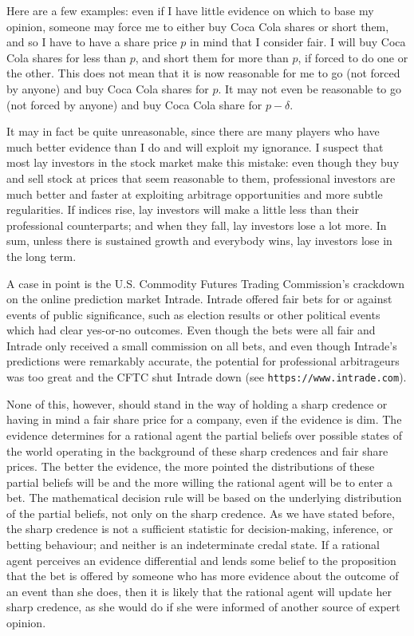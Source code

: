 \documentclass[11pt]{article}
\begin{document}
Here are a few examples: even if I have little evidence on which to
base my opinion, someone may force me to either buy Coca Cola shares
or short them, and so I have to have a share price $p$ in mind that I
consider fair. I will buy Coca Cola shares for less than $p$, and
short them for more than $p$, if forced to do one or the other. This
does not mean that it is now reasonable for me to go (not forced by
anyone) and buy Coca Cola shares for $p$. It may not even be
reasonable to go (not forced by anyone) and buy Coca Cola share for
$p-\delta$.

It may in fact be quite unreasonable, since there are many players who
have much better evidence than I do and will exploit my ignorance. I
suspect that most lay investors in the stock market make this mistake:
even though they buy and sell stock at prices that seem reasonable to
them, professional investors are much better and faster at exploiting
arbitrage opportunities and more subtle regularities. If indices rise,
lay investors will make a little less than their professional
counterparts; and when they fall, lay investors lose a lot more. In
sum, unless there is sustained growth and everybody wins, lay
investors lose in the long term.

A case in point is the U.S. Commodity Futures Trading Commission's
crackdown on the online prediction market Intrade. Intrade offered
fair bets for or against events of public significance, such as
election results or other political events which had clear yes-or-no
outcomes. Even though the bets were all fair and Intrade only received
a small commission on all bets, and even though Intrade's predictions
were remarkably accurate, the potential for professional arbitrageurs
was too great and the CFTC shut Intrade down (see
\texttt{https://www.intrade.com}). 

None of this, however, should stand in the way of holding a sharp
credence or having in mind a fair share price for a company, even if
the evidence is dim. The evidence determines for a rational agent the
partial beliefs over possible states of the world operating in the
background of these sharp credences and fair share prices. The better
the evidence, the more pointed the distributions of these partial
beliefs will be and the more willing the rational agent will be to
enter a bet. The mathematical decision rule will be based on the
underlying distribution of the partial beliefs, not only on the sharp
credence. As we have stated before, the sharp credence is not a
sufficient statistic for decision-making, inference, or betting
behaviour; and neither is an indeterminate credal state. If a rational
agent perceives an evidence differential and lends some belief to the
proposition that the bet is offered by someone who has more evidence
about the outcome of an event than she does, then it is likely that
the rational agent will update her sharp credence, as she would do if
she were informed of another source of expert opinion.
\end{document}
